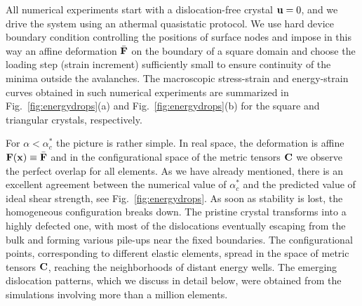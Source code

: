 \documentclass[CRPHYS,Unicode,manuscript]{cedram}
\begin{document}
All numerical experiments start with a dislocation-free crystal $\bold u =0$, and we drive the system using an athermal quasistatic protocol. We use hard device boundary condition controlling the positions of surface nodes and impose in this way an affine deformation $\bar{\bf F}$ on the boundary of a square domain and choose the loading step (strain increment) sufficiently small to ensure continuity of the minima outside the avalanches. The macroscopic stress-strain and energy-strain curves obtained in such numerical experiments are summarized in Fig.~\ref{fig:energydrops}(a) and Fig.~\ref{fig:energydrops}(b) for the square and triangular crystals, respectively.

For $\alpha<\alpha^*_c$ the picture is rather simple. In real space, the deformation is affine ${\bf F(\bf x)}\equiv\bar{\bf F}$ and in the configurational space of the metric tensors ${\bf C}$  we observe the perfect overlap for all elements.    As we have already mentioned, there is an excellent agreement between the numerical value of $\alpha^*_c$ and the predicted value of ideal shear strength, see Fig.~\ref{fig:energydrops}. As soon as stability is lost, the homogeneous configuration breaks down. The pristine crystal transforms into a highly defected one, with most of the dislocations eventually escaping from the bulk and forming various pile-ups near the fixed boundaries. The configurational points, corresponding to different elastic elements, spread in the space of metric tensors ${\bf C}$, reaching the neighborhoods of distant energy wells. The emerging dislocation patterns, which we discuss in detail below,  were obtained from the simulations involving  more than a million elements.  


%
%
%
\end{document}
